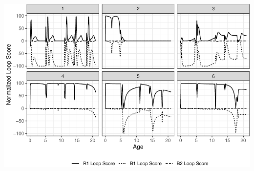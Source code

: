 \documentclass[
]{article}
\begin{document}
\includegraphics{Study-1_files/figure-latex/plot loop scores-1.pdf}
\end{document}
